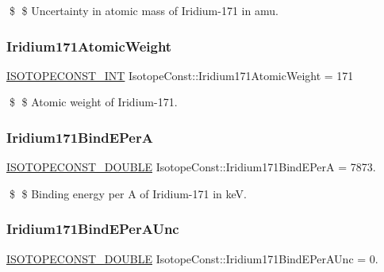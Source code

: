 \$ \$ Uncertainty in atomic mass of Iridium-\/171 in amu. \mbox{\label{group___isotope_const-_iridium-_ir171_gaa1991b477a3074b29627bb61deb34e66}} 
\subsubsection{\texorpdfstring{Iridium171\+Atomic\+Weight}{Iridium171AtomicWeight}}
{\footnotesize\ttfamily \mbox{\hyperlink{group___isotope_const-_macros_ga5f18360b3e99483a35c32d789e62621c}{I\+S\+O\+T\+O\+P\+E\+C\+O\+N\+S\+T\+\_\+\+I\+NT}} Isotope\+Const\+::\+Iridium171\+Atomic\+Weight = 171}

\$ \$ Atomic weight of Iridium-\/171. \mbox{\label{group___isotope_const-_iridium-_ir171_ga43c747b02c15cb12f91c9d2bd4d75d94}} 
\subsubsection{\texorpdfstring{Iridium171\+Bind\+E\+PerA}{Iridium171BindEPerA}}
{\footnotesize\ttfamily \mbox{\hyperlink{group___isotope_const-_macros_ga8f45a7272ce02c0b4c65c44636ed719a}{I\+S\+O\+T\+O\+P\+E\+C\+O\+N\+S\+T\+\_\+\+D\+O\+U\+B\+LE}} Isotope\+Const\+::\+Iridium171\+Bind\+E\+PerA = 7873.}

\$ \$ Binding energy per A of Iridium-\/171 in keV. \mbox{\label{group___isotope_const-_iridium-_ir171_gaa07912282a180f7ddc2065e4e4d91cce}} 
\subsubsection{\texorpdfstring{Iridium171\+Bind\+E\+Per\+A\+Unc}{Iridium171BindEPerAUnc}}
{\footnotesize\ttfamily \mbox{\hyperlink{group___isotope_const-_macros_ga8f45a7272ce02c0b4c65c44636ed719a}{I\+S\+O\+T\+O\+P\+E\+C\+O\+N\+S\+T\+\_\+\+D\+O\+U\+B\+LE}} Isotope\+Const\+::\+Iridium171\+Bind\+E\+Per\+A\+Unc = 0.}

